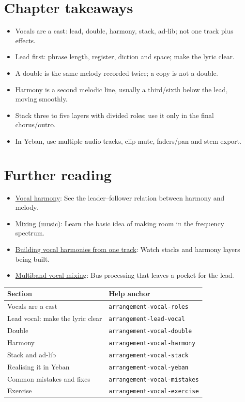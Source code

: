 \section{Chapter takeaways}
\label{sec:vocal-takeaways}

\begin{itemize}
\item Vocals are a cast: lead, double, harmony, stack, ad-lib; not one track plus effects.
\item Lead first: phrase length, register, diction and space; make the lyric clear.
\item A double is the same melody recorded twice; a copy is not a double.
\item Harmony is a second melodic line, usually a third/sixth below the lead, moving smoothly.
\item Stack three to five layers with divided roles; use it only in the final chorus/outro.
\item In Yeban, use multiple audio tracks, clip mute, faders/pan and stem export.
\end{itemize}

\section{Further reading}
\label{sec:09-vocals-further-reading}
\begin{itemize}
  \item \href{https://en.wikipedia.org/wiki/Vocal_harmony}{Vocal harmony}: See the leader–follower relation between harmony and melody.
  \item \href{https://en.wikipedia.org/wiki/Mixing_(music)}{Mixing (music)}: Learn the basic idea of making room in the frequency spectrum.
  \item \href{https://www.youtube.com/watch?v=ADPbHK3Wi4k}{Building vocal harmonies from one track}: Watch stacks and harmony layers being built.
  \item \href{https://www.youtube.com/watch?v=DSc9i4DpjQE}{Multiband vocal mixing}: Bus processing that leaves a pocket for the lead.
\end{itemize}

\begin{helpmapping}
\begin{longtable}{p{}p{}}
\toprule
Section & Help anchor \\
\midrule
Vocals are a cast & \texttt{arrangement-vocal-roles} \\
Lead vocal: make the lyric clear & \texttt{arrangement-lead-vocal} \\
Double & \texttt{arrangement-vocal-double} \\
Harmony & \texttt{arrangement-vocal-harmony} \\
Stack and ad-lib & \texttt{arrangement-vocal-stack} \\
Realising it in Yeban & \texttt{arrangement-vocal-yeban} \\
Common mistakes and fixes & \texttt{arrangement-vocal-mistakes} \\
Exercise & \texttt{arrangement-vocal-exercise} \\
\bottomrule
\end{longtable}
\end{helpmapping}
